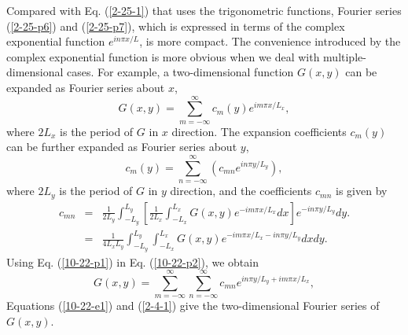 \documentclass{article}
\begin{document}
Compared with Eq. (\ref{2-25-1}) that uses the trigonometric functions,
Fourier series (\ref{2-25-p6}) and (\ref{2-25-p7}), which is expressed in
terms of the complex exponential function $e^{i n \pi x / L}$, is more
compact. The convenience introduced by the complex exponential function is
more obvious when we deal with multiple-dimensional cases. For example, a
two-dimensional function $G (x, y)$ can be expanded as Fourier series about
$x$,
\begin{equation}
  \label{10-22-p2} G (x, y) = \sum_{m = - \infty}^{\infty} c_m (y) e^{i m \pi
  x / L_x},
\end{equation}
where $2 L_x$ is the period of $G$ in $x$ direction. The expansion
coefficients $c_m (y)$ can be further expanded as Fourier series about $y$,
\begin{equation}
  \label{10-22-p1} c_m (y) = \sum_{n = - \infty}^{\infty} (c_{m n} e^{i n \pi
  y / L_y}),
\end{equation}
where $2 L_y$ is the period of $G$ in $y$ direction, and the coefficients
$c_{m n}$ is given by
\begin{eqnarray}
  c_{m n} & = & \frac{1}{2 L_y} \int_{- L_y}^{L_y} \left[ \frac{1}{2 L_x}
  \int_{- L_x}^{L_x} G (x, y) e^{- i m \pi x / L_x} d x \right] e^{- i n \pi y
  / L_y} d y. \nonumber\\
  & = & \frac{1}{4 L_x L_y} \int_{- L_y}^{L_y} \int_{- L_x}^{L_x} G (x, y)
  {e^{- i m \pi x / L_x - i n \pi y / L_y}}  d x d y.  \label{2-4-1}
\end{eqnarray}
Using Eq. (\ref{10-22-p1}) in Eq. (\ref{10-22-p2}), we obtain
\begin{equation}
  \label{10-22-e1} G (x, y) = \sum_{m = - \infty}^{\infty} \sum_{n = -
  \infty}^{\infty} c_{m n} e^{i n \pi y / L_y + i m \pi x / L_x},
\end{equation}
Equations (\ref{10-22-e1}) and (\ref{2-4-1}) give the two-dimensional Fourier
series of $G (x, y)$.
\end{document}
